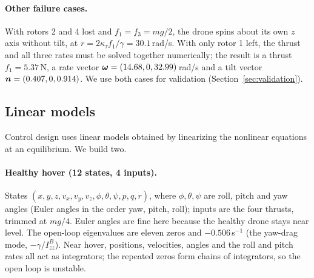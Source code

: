 \paragraph{Other failure cases.} With rotors 2 and 4 lost and $f_1 = f_3 = mg/2$, the drone spins about its own $z$ axis without tilt, at $r = 2\kappa_\tau f_1/\gamma = 30.1$\,rad/s. With only rotor 1 left, the thrust and all three rates must be solved together numerically; the result is a thrust $f_1 = 5.37$\,N, a rate vector $\boldsymbol{\omega} = (14.68, 0, 32.99)$\,rad/s and a tilt vector $\boldsymbol{n} = (0.407, 0, 0.914)$. We use both cases for validation (Section~\ref{sec:validation}).

\subsection{Linear models}\label{sec:linmodels}
Control design uses linear models obtained by linearizing the nonlinear equations at an equilibrium. We build two.

\paragraph{Healthy hover (12 states, 4 inputs).} States $(x,y,z,v_x,v_y,v_z,\phi,\theta,\psi,p,q,r)$, where $\phi,\theta,\psi$ are roll, pitch and yaw angles (Euler angles in the order yaw, pitch, roll); inputs are the four thrusts, trimmed at $mg/4$. Euler angles are fine here because the healthy drone stays near level. The open-loop eigenvalues are eleven zeros and $-0.506$\,s$^{-1}$ (the yaw-drag mode, $-\gamma/I^B_{zz}$). Near hover, positions, velocities, angles and the roll and pitch rates all act as integrators; the repeated zeros form chains of integrators, so the open loop is unstable.


